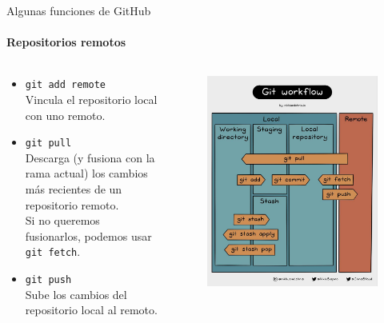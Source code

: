 \documentclass[11pt]{beamer}
\begin{document}
\begin{frame}{Algunas funciones de GitHub}
    \framesubtitle{Repositorios remotos}
	\begin{columns}[c]
	    \begin{column}{0.45\textwidth}
            \begin{itemize}
                \item \texttt{git add remote}\\Vincula el repositorio local con uno remoto.
                \item \texttt{git pull}\\Descarga (y fusiona con la rama actual) los cambios más recientes de un repositorio remoto. \\
                \footnotesize Si no queremos fusionarlos, podemos usar \texttt{git fetch}.\normalsize
                \item \texttt{git push}\\Sube los cambios del repositorio local al remoto.
            \end{itemize}
	    \end{column}

        \begin{column}{0.65\textwidth}
            \begin{figure}
                \centering
                \includegraphics[width=0.75\linewidth]{workflow.jpg}
            \end{figure}
        \end{column}
	\end{columns}
\end{frame}
\end{document}
